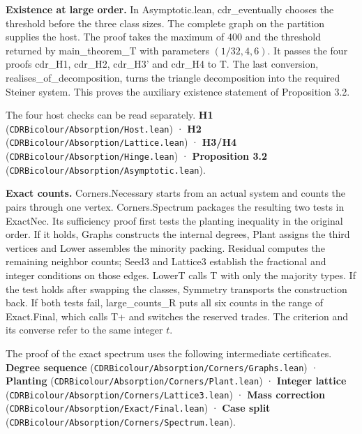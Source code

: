 \documentclass[english,11pt,a4paper]{article}
\begin{document}
\textbf{Existence at large order.} In Asymptotic.lean, cdr\_eventually chooses the threshold before the three class sizes. The complete graph on the partition supplies the host. The proof takes the maximum of 400 and the threshold returned by main\_theorem\_T with parameters \((1/32,4,6)\). It passes the four proofs cdr\_H1, cdr\_H2, cdr\_H3' and cdr\_H4 to T. The last conversion, realises\_of\_decomposition, turns the triangle decomposition into the required Steiner system. This proves the auxiliary existence statement of Proposition 3.2.

The four host checks can be read separately. \textbf{H1} (\texttt{CDRBicolour/\allowbreak{}Absorption/\allowbreak{}Host.\allowbreak{}lean}) · \textbf{H2} (\texttt{CDRBicolour/\allowbreak{}Absorption/\allowbreak{}Lattice.\allowbreak{}lean}) · \textbf{H3/H4} (\texttt{CDRBicolour/\allowbreak{}Absorption/\allowbreak{}Hinge.\allowbreak{}lean}) · \textbf{Proposition 3.2} (\texttt{CDRBicolour/\allowbreak{}Absorption/\allowbreak{}Asymptotic.\allowbreak{}lean}).

\textbf{Exact counts.} Corners.Necessary starts from an actual system and counts the pairs through one vertex. Corners.Spectrum packages the resulting two tests in ExactNec. Its sufficiency proof first tests the planting inequality in the original order. If it holds, Graphs constructs the internal degrees, Plant assigns the third vertices and Lower assembles the minority packing. Residual computes the remaining neighbor counts; Seed3 and Lattice3 establish the fractional and integer conditions on those edges. LowerT calls T with only the majority types. If the test holds after swapping the classes, Symmetry transports the construction back. If both tests fail, large\_counts\_R puts all six counts in the range of Exact.Final, which calls T+ and switches the reserved trades. The criterion and its converse refer to the same integer \(t\).

The proof of the exact spectrum uses the following intermediate certificates. \textbf{Degree sequence} (\texttt{CDRBicolour/\allowbreak{}Absorption/\allowbreak{}Corners/\allowbreak{}Graphs.\allowbreak{}lean}) · \textbf{Planting} (\texttt{CDRBicolour/\allowbreak{}Absorption/\allowbreak{}Corners/\allowbreak{}Plant.\allowbreak{}lean}) · \textbf{Integer lattice} (\texttt{CDRBicolour/\allowbreak{}Absorption/\allowbreak{}Corners/\allowbreak{}Lattice3.\allowbreak{}lean}) · \textbf{Mass correction} (\texttt{CDRBicolour/\allowbreak{}Absorption/\allowbreak{}Exact/\allowbreak{}Final.\allowbreak{}lean}) · \textbf{Case split} (\texttt{CDRBicolour/\allowbreak{}Absorption/\allowbreak{}Corners/\allowbreak{}Spectrum.\allowbreak{}lean}).
\end{document}
